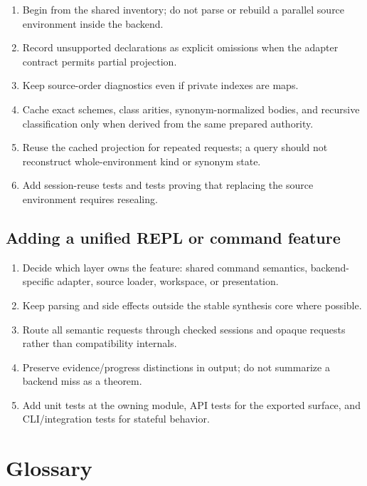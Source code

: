 \documentclass[10pt,letterpaper,oneside]{report}
\begin{document}
\begin{enumerate}
  \item Begin from the shared inventory; do not parse or rebuild a parallel source environment inside the backend.
  \item Record unsupported declarations as explicit omissions when the adapter contract permits partial projection.
  \item Keep source-order diagnostics even if private indexes are maps.
  \item Cache exact schemes, class arities, synonym-normalized bodies, and recursive classification only when derived from the same prepared authority.
  \item Reuse the cached projection for repeated requests; a query should not reconstruct whole-environment kind or synonym state.
  \item Add session-reuse tests and tests proving that replacing the source environment requires resealing.
\end{enumerate}

\section{Adding a unified REPL or command feature}

\begin{enumerate}
  \item Decide which layer owns the feature: shared command semantics, backend-specific adapter, source loader, workspace, or presentation.
  \item Keep parsing and side effects outside the stable synthesis core where possible.
  \item Route all semantic requests through checked sessions and opaque requests rather than compatibility internals.
  \item Preserve evidence/progress distinctions in output; do not summarize a backend miss as a theorem.
  \item Add unit tests at the owning module, API tests for the exported surface, and CLI/integration tests for stateful behavior.
\end{enumerate}

\chapter{Glossary}\label{app:glossary}
\end{document}

